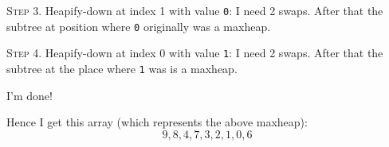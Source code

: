 


\textsc{Step 3.}
Heapify-down at index 1 with value \texttt{0}:
I need 2 swaps.
After that the subtree at position where \texttt{0} originally 
was a maxheap.



\textsc{Step 4.}
Heapify-down at index 0 with value \texttt{1}:
I need 2 swaps.
After that the subtree at the place
where \texttt{1} was is a maxheap.



I'm done!

Hence I get this array (which represents the above maxheap):
\[
9,8,4,7,3,2,1,0,6
\]









